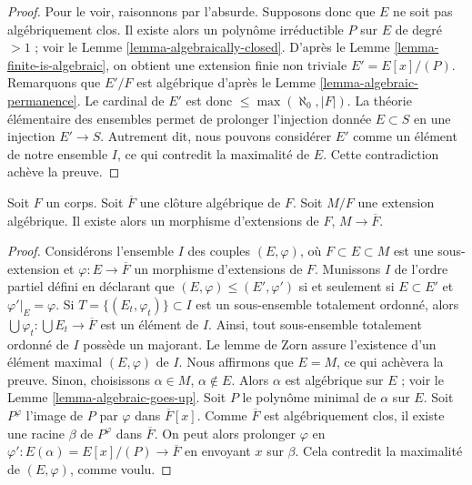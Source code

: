 \begin{proof}
\medskip\noindent
Pour le voir, raisonnons par l'absurde. Supposons donc que $E$ ne soit pas
algébriquement clos. Il existe alors un polynôme irréductible
$P$ sur $E$ de degré $> 1$ ; voir le Lemme \ref{lemma-algebraically-closed}.
D'après le Lemme \ref{lemma-finite-is-algebraic}, on obtient une extension finie
non triviale $E' = E[x]/(P)$. Remarquons que $E'/F$ est algébrique d'après le
Lemme \ref{lemma-algebraic-permanence}.
Le cardinal de $E'$ est donc $\leq \max(\aleph_0, |F|)$.
La théorie élémentaire des ensembles permet de prolonger l'injection donnée
$E \subset S$ en une injection $E' \to S$. Autrement dit, nous pouvons
considérer $E'$ comme un élément de notre ensemble $I$, ce qui contredit la
maximalité de $E$. Cette contradiction achève la preuve.
\end{proof}

\begin{lemma}
\label{lemma-map-into-algebraic-closure}
Soit $F$ un corps. Soit $\overline{F}$ une clôture algébrique de $F$.
Soit $M/F$ une extension algébrique. Il existe alors un morphisme
d'extensions de $F$, $M \to \overline{F}$.
\end{lemma}

\begin{proof}
Considérons l'ensemble $I$ des couples $(E, \varphi)$, où $F \subset E \subset M$
est une sous-extension et $\varphi : E \to \overline{F}$ un morphisme
d'extensions de $F$. Munissons $I$ de l'ordre partiel défini en déclarant que
$(E, \varphi) \leq (E', \varphi')$ si et seulement si $E \subset E'$ et
$\varphi'|_E = \varphi$. Si $T = \{(E_t,  \varphi_t)\} \subset I$
est un sous-ensemble totalement ordonné, alors
$\bigcup \varphi_t : \bigcup E_t \to \overline{F}$ est un élément de $I$.
Ainsi, tout sous-ensemble totalement ordonné de $I$ possède un majorant.
Le lemme de Zorn assure l'existence d'un élément maximal $(E, \varphi)$ de $I$.
Nous affirmons que $E = M$, ce qui achèvera la preuve. Sinon,
choisissons $\alpha \in M$, $\alpha \not \in E$. Alors $\alpha$ est algébrique
sur $E$ ; voir le Lemme \ref{lemma-algebraic-goes-up}.
Soit $P$ le polynôme minimal de $\alpha$ sur $E$.
Soit $P^\varphi$ l'image de $P$ par $\varphi$ dans $\overline{F}[x]$.
Comme $\overline{F}$ est algébriquement clos, il existe une racine $\beta$
de $P^\varphi$ dans $\overline{F}$. On peut alors prolonger $\varphi$ en
$\varphi' : E(\alpha) = E[x]/(P) \to \overline{F}$ en envoyant
$x$ sur $\beta$. Cela contredit la maximalité de $(E, \varphi)$,
comme voulu.
\end{proof}

